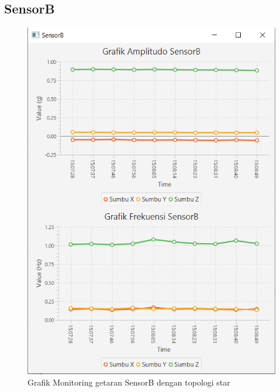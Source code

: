 \subsection{SensorB}
\begin{figure}[H] 
	\centering  
	\includegraphics[scale=1]{Lampiran/HasilPengujian/sensorB_star.PNG} 
	\caption[Grafik Monitoring getaran SensorB dengan topologi star]{Grafik Monitoring getaran SensorB dengan topologi star}
	\label{fig:grafik_B_star_paskal} 
\end{figure}


